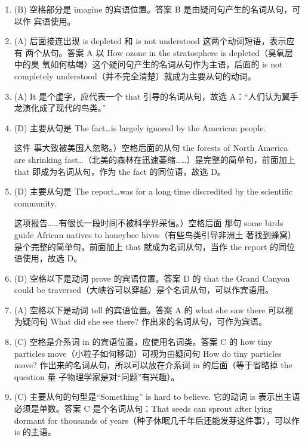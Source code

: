 \documentclass{yufa}
\begin{document}
\begin{enumerate}
\item (B) 空格部分是 imagine 的宾语位置。答案 B 是由疑问句产生的名词从句，可以作
  宾语使用。

\item (A) 后面接连出现 is depleted 和 is not understood 这两个动词短语，表示应有
  两个从句。答案 A 以 How ozone in the stratosphere is depleted（臭氧层中的臭
  氧如何枯竭）这个疑问句产生的名词从句作为主语，后面的 is not completely
  understood（并不完全清楚）就成为主要从句的动词。
\item (A) It 是个虚字，应代表一个 that 引导的名词从句，故选 A：“人们认为翼手龙演化成了现代的鸟类。”

\item (D) 主要从句是 The fact…is largely ignored by the American people.

这件
  事大致被美国人忽略。）空格后面的从句 the forests of North America are
  shrinking fast…（北美的森林在迅速萎缩……）是完整的简单句，前面加上 that
  即成为名词从句，作为 the fact 的同位语，故选 D。


\item (D) 主要从句是 The report…was for a long time discredited by the
  scientific community.

这项报告……有很长一段时间不被科学界采信。）空格后面
  那句 some birds guide African natives to honeybee hives（有些鸟类引导非洲土
  著找到蜂窝）是个完整的简单句，前面加上 that 就成为名词从句，当作 the
  report 的同位语使用，故选 D。

\item (D) 空格以下是动词 prove 的宾语位置。答案 D 的 that the Grand Canyon could be traversed（大峡谷可以穿越）是个名词从句，可以作宾语用。


\item  (A) 空格以下是动词 tell 的宾语位置。答案 A 的 what she saw there 可以视为疑问句 What did she see there? 作出来的名词从句，可作为宾语。


\item (C) 空格是介系词 in 的宾语位置，应使用名词类。答案 C 的 how tiny
  particles move（小粒子如何移动）可视为由疑问句 How do tiny particles move?
  作出来的名词从句，所以可以放在介系词 in 的后面（等于省略掉 the question 量
  子物理学家是对“问题”有兴趣）。


\item  (C) 主要从句的句型是“Something” is hard to believe. 它的动词 is 表示出主语必须是单数。答案 C 是个名词从句：That seeds can sprout after lying dormant for thousands of years（种子休眠几千年后还能发芽这件事），可以作 is 的主语。


\end{enumerate}
\end{document}
